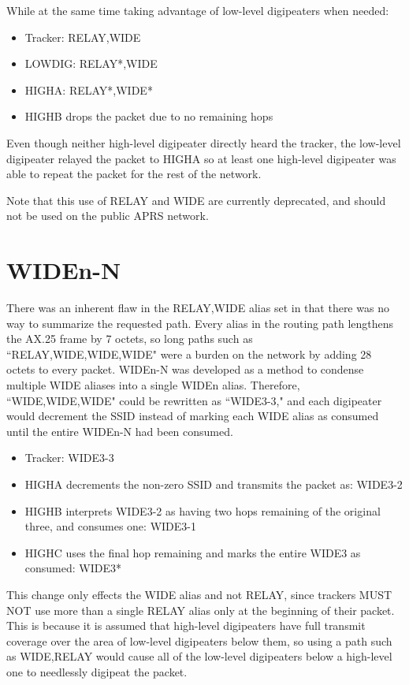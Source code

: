 While at the same time taking advantage of low-level digipeaters when needed:
\begin{itemize}
	\item Tracker: RELAY,WIDE
	\item LOWDIG: RELAY*,WIDE
	\item HIGHA: RELAY*,WIDE*
	\item HIGHB drops the packet due to no remaining hops
\end{itemize}

Even though neither high-level digipeater directly heard the tracker,
the low-level digipeater relayed the packet to HIGHA so at least one high-level
digipeater was able to repeat the packet for the rest of the network.

Note that this use of RELAY and WIDE are currently deprecated,
and should not be used on the public APRS network.

\section{WIDEn-N}

There was an inherent flaw in the RELAY,WIDE alias set
in that there was no way to summarize the requested path.
Every alias in the routing path lengthens the AX.25 frame by 7 octets,
so long paths such as ``RELAY,WIDE,WIDE,WIDE" were a burden on the network
by adding 28 octets to every packet.
WIDEn-N was developed as a method to condense multiple WIDE aliases into a single WIDEn alias.
Therefore, ``WIDE,WIDE,WIDE" could be rewritten as ``WIDE3-3," and each digipeater would
decrement the SSID instead of marking each WIDE alias as consumed until the entire WIDEn-N had
been consumed.

\begin{itemize}
	\item Tracker: WIDE3-3
	\item HIGHA decrements the non-zero SSID and transmits the packet as: WIDE3-2
	\item HIGHB interprets WIDE3-2 as having two hops remaining of the original three, 
		and consumes one: WIDE3-1
	\item HIGHC uses the final hop remaining and marks the entire WIDE3 as consumed: WIDE3*
\end{itemize}

This change only effects the WIDE alias and not RELAY,
since trackers MUST NOT use more than a single RELAY alias only at the beginning of their packet.
This is because it is assumed that high-level digipeaters have full transmit coverage over
the area of low-level digipeaters below them, so using a path such as WIDE,RELAY would
cause all of the low-level digipeaters below a high-level one to needlessly digipeat the packet.

